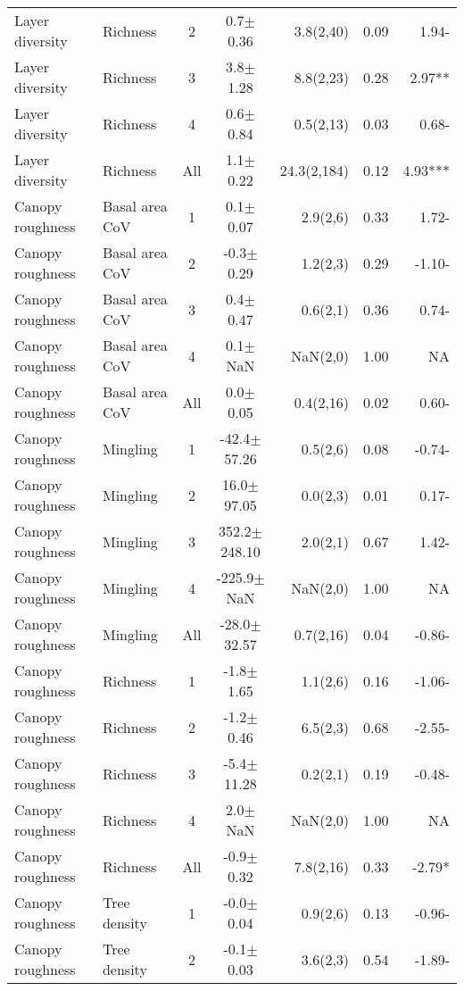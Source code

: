 \begin{longtable}{llcS[table-format=5.1(4.2)]rS[table-format=1.2]r}
  Layer diversity & Richness & 2 & 0.7$\pm$0.36 & 3.8(2,40) & 0.09 & 1.94- \\ 
  Layer diversity & Richness & 3 & 3.8$\pm$1.28 & 8.8(2,23) & 0.28 & 2.97** \\ 
  Layer diversity & Richness & 4 & 0.6$\pm$0.84 & 0.5(2,13) & 0.03 & 0.68- \\ 
  Layer diversity & Richness & All & 1.1$\pm$0.22 & 24.3(2,184) & 0.12 & 4.93*** \\ 
   \midrule
Canopy roughness & Basal area CoV & 1 & 0.1$\pm$0.07 & 2.9(2,6) & 0.33 & 1.72- \\ 
  Canopy roughness & Basal area CoV & 2 & -0.3$\pm$0.29 & 1.2(2,3) & 0.29 & -1.10- \\ 
  Canopy roughness & Basal area CoV & 3 & 0.4$\pm$0.47 & 0.6(2,1) & 0.36 & 0.74- \\ 
  Canopy roughness & Basal area CoV & 4 & 0.1$\pm$NaN & NaN(2,0) & 1.00 & NA \\ 
  Canopy roughness & Basal area CoV & All & 0.0$\pm$0.05 & 0.4(2,16) & 0.02 & 0.60- \\ 
   \midrule
Canopy roughness & Mingling & 1 & -42.4$\pm$57.26 & 0.5(2,6) & 0.08 & -0.74- \\ 
  Canopy roughness & Mingling & 2 & 16.0$\pm$97.05 & 0.0(2,3) & 0.01 & 0.17- \\ 
  Canopy roughness & Mingling & 3 & 352.2$\pm$248.10 & 2.0(2,1) & 0.67 & 1.42- \\ 
  Canopy roughness & Mingling & 4 & -225.9$\pm$NaN & NaN(2,0) & 1.00 & NA \\ 
  Canopy roughness & Mingling & All & -28.0$\pm$32.57 & 0.7(2,16) & 0.04 & -0.86- \\ 
   \midrule
Canopy roughness & Richness & 1 & -1.8$\pm$1.65 & 1.1(2,6) & 0.16 & -1.06- \\ 
  Canopy roughness & Richness & 2 & -1.2$\pm$0.46 & 6.5(2,3) & 0.68 & -2.55- \\ 
  Canopy roughness & Richness & 3 & -5.4$\pm$11.28 & 0.2(2,1) & 0.19 & -0.48- \\ 
  Canopy roughness & Richness & 4 & 2.0$\pm$NaN & NaN(2,0) & 1.00 & NA \\ 
  Canopy roughness & Richness & All & -0.9$\pm$0.32 & 7.8(2,16) & 0.33 & -2.79* \\ 
   \midrule
Canopy roughness & Tree density & 1 & -0.0$\pm$0.04 & 0.9(2,6) & 0.13 & -0.96- \\ 
  Canopy roughness & Tree density & 2 & -0.1$\pm$0.03 & 3.6(2,3) & 0.54 & -1.89- \\ 

\end{longtable}
